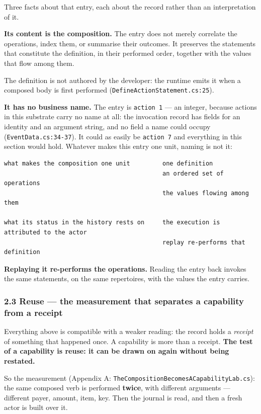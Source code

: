 \documentclass[
]{article}
\begin{document}
Three facts about that entry, each about the record rather than an
interpretation of it.

\textbf{Its content is the composition.} The entry does not merely
correlate the operations, index them, or summarise their outcomes. It
preserves the statements that constitute the definition, in their
performed order, together with the values that flow among them.

The definition is not authored by the developer: the runtime emits it
when a composed body is first performed
(\texttt{DefineActionStatement.cs:25}).

\textbf{It has no business name.} The entry is \texttt{action\ 1} --- an
integer, because actions in this substrate carry no name at all: the
invocation record has fields for an identity and an argument string, and
no field a name could occupy (\texttt{EventData.cs:34-37}). It could as
easily be \texttt{action\ 7} and everything in this section would hold.
Whatever makes this entry one unit, naming is not it:

\begin{verbatim}
what makes the composition one unit         one definition
                                            an ordered set of operations
                                            the values flowing among them

what its status in the history rests on     the execution is attributed to the actor
                                            replay re-performs that definition
\end{verbatim}

\textbf{Replaying it re-performs the operations.} Reading the entry back
invokes the same statements, on the same repertoires, with the values
the entry carries.

\subsubsection{2.3 Reuse --- the measurement that separates a capability
from a
receipt}\label{reuse-the-measurement-that-separates-a-capability-from-a-receipt}

Everything above is compatible with a weaker reading: the record holds a
\emph{receipt} of something that happened once. A capability is more
than a receipt. \textbf{The test of a capability is reuse: it can be
drawn on again without being restated.}

So the measurement (Appendix A:
\texttt{TheCompositionBecomesACapabilityLab.cs}): the same composed verb
is performed \textbf{twice}, with different arguments --- different
payer, amount, item, key. Then the journal is read, and then a fresh
actor is built over it.
\end{document}
